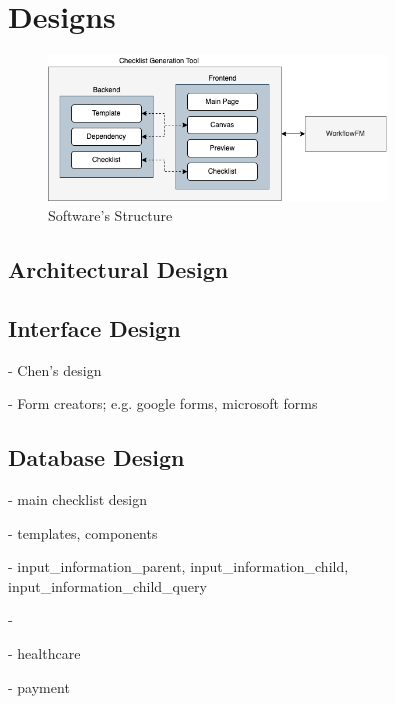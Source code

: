 
\section{Designs}

\begin{figure}[ht]
    \centering
    \includegraphics[width=0.8\textwidth]{overleaf/images/system_structure.png}
    \caption{Software's Structure}
    \label{fig:software_structure}
\end{figure}

\subsection{Architectural Design}

\subsection{Interface Design}

- Chen's design \cite{checklistdesign}

- Form creators; e.g. google forms, microsoft forms

\subsection{Database Design}
- main checklist design

- templates, components

- input\_information\_parent, input\_information\_child, input\_information\_child\_query

-

- healthcare

- payment

